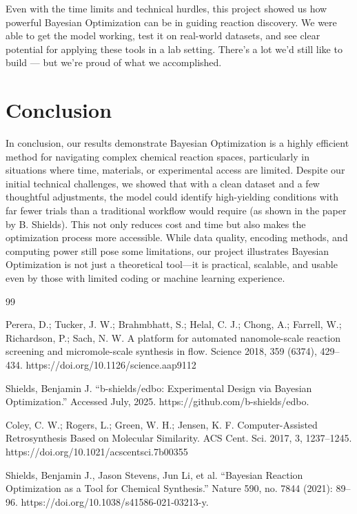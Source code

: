 \documentclass[12pt]{article}
\begin{document}
Even with the time limits and technical hurdles, this project showed us how powerful Bayesian Optimization can be in guiding reaction discovery. We were able to get the model working, test it on real-world datasets, and see clear potential for applying these tools in a lab setting. There’s a lot we’d still like to build — but we’re proud of what we accomplished.
\section{Conclusion}
In conclusion, our results demonstrate Bayesian Optimization is a highly efficient method for navigating complex chemical reaction spaces, particularly in situations where time, materials, or experimental access are limited. Despite our initial technical challenges, we showed that with a clean dataset and a few thoughtful adjustments, the model could identify high-yielding conditions with far fewer trials than a traditional workflow would require (as shown in the paper by B. Shields). This not only reduces cost and time but also makes the optimization process more accessible. While data quality, encoding methods, and computing power still pose some limitations, our project illustrates Bayesian Optimization is not just a theoretical tool—it is practical, scalable, and usable even by those with limited coding or machine learning experience.


\begin{thebibliography}{99}

Perera, D.; Tucker, J. W.; Brahmbhatt, S.; Helal, C. J.; Chong, A.; Farrell, W.; Richardson, P.; Sach, N. W. A platform for automated nanomole-scale reaction screening and micromole-scale synthesis in flow. Science 2018, 359 (6374), 429–434. https://doi.org/10.1126/science.aap9112

Shields, Benjamin J. “b-shields/edbo: Experimental Design via Bayesian Optimization.” Accessed July, 2025. https://github.com/b-shields/edbo.

Coley, C. W.; Rogers, L.; Green, W. H.; Jensen, K. F. Computer-Assisted Retrosynthesis Based on Molecular Similarity. ACS Cent. Sci. 2017, 3, 1237–1245. https://doi.org/10.1021/acscentsci.7b00355

Shields, Benjamin J., Jason Stevens, Jun Li, et al. “Bayesian Reaction Optimization as a Tool for Chemical Synthesis.” Nature 590, no. 7844 (2021): 89–96. https://doi.org/10.1038/s41586-021-03213-y.

\end{thebibliography}
\end{document}
